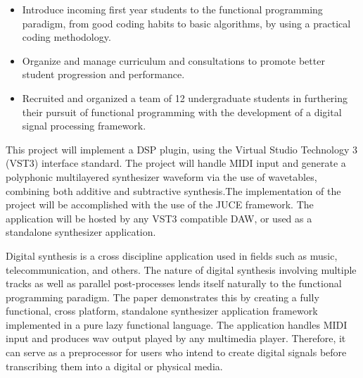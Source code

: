 \documentclass[10pt,a4paper]{altacv}
\begin{document}
\divider

\small{
\begin{itemize}
\item Introduce incoming first year students to the functional programming paradigm, from good coding habits to basic algorithms, by using a practical coding methodology.
\item Organize and manage curriculum and consultations to promote better student progression and performance.
\item Recruited and organized a team of 12 undergraduate students in furthering their pursuit of functional programming with the development of a digital signal processing framework.  
\end{itemize}
}


\small{
	This project will implement a DSP plugin, using the Virtual Studio Technology 3 (VST3) interface standard. The project will handle MIDI input and generate a polyphonic multilayered synthesizer waveform via the use of wavetables, combining both additive and subtractive synthesis.The implementation of the project will be accomplished with the use of the JUCE framework. The application will be hosted by any VST3 compatible DAW, or used as a standalone synthesizer application.\\
}

\divider

\small{Digital synthesis is a cross discipline application used in fields such as music, telecommunication, and others. The nature of digital synthesis involving multiple tracks as well as parallel post-processes lends itself naturally to the functional programming paradigm. The paper demonstrates this by creating a fully functional, cross platform, standalone synthesizer application framework implemented in a pure lazy functional language. The application handles MIDI input and produces wav output played by any multimedia player. Therefore, it can serve as a preprocessor for users who intend to create digital signals before transcribing them into a digital or physical media.}


\end{document}
